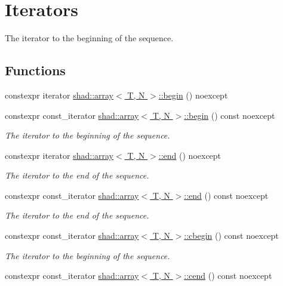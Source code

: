 \hypertarget{group__Iterators}{\section{Iterators}
\label{group__Iterators}
}


The iterator to the beginning of the sequence.  


\subsection*{Functions}
\begin{DoxyCompactItemize}
\item 
constexpr iterator \hyperlink{group__Iterators_ga906e65071e1b075ad66d2bfa3cc33046}{shad\-::array$<$ T, N $>$\-::begin} () noexcept
\item 
constexpr const\-\_\-iterator \hyperlink{group__Iterators_ga0c88522dde8cb2ff1c2c523abbb01ff0}{shad\-::array$<$ T, N $>$\-::begin} () const noexcept
\begin{DoxyCompactList}\small\item\em The iterator to the beginning of the sequence. \end{DoxyCompactList}\item 
constexpr iterator \hyperlink{group__Iterators_ga1c4d3a9b4b7ba4890e21bad16c8b4a58}{shad\-::array$<$ T, N $>$\-::end} () noexcept
\begin{DoxyCompactList}\small\item\em The iterator to the end of the sequence. \end{DoxyCompactList}\item 
constexpr const\-\_\-iterator \hyperlink{group__Iterators_ga75ec94abc79b646edb6d978b98db69da}{shad\-::array$<$ T, N $>$\-::end} () const noexcept
\begin{DoxyCompactList}\small\item\em The iterator to the end of the sequence. \end{DoxyCompactList}\item 
constexpr const\-\_\-iterator \hyperlink{group__Iterators_gab6c412cc8aa5cbd90f50263e3aa76915}{shad\-::array$<$ T, N $>$\-::cbegin} () const noexcept
\begin{DoxyCompactList}\small\item\em The iterator to the beginning of the sequence. \end{DoxyCompactList}\item 
constexpr const\-\_\-iterator \hyperlink{group__Iterators_ga9781beb1f058654a6b1a2580e7a5f9a4}{shad\-::array$<$ T, N $>$\-::cend} () const noexcept

\end{DoxyCompactItemize}
